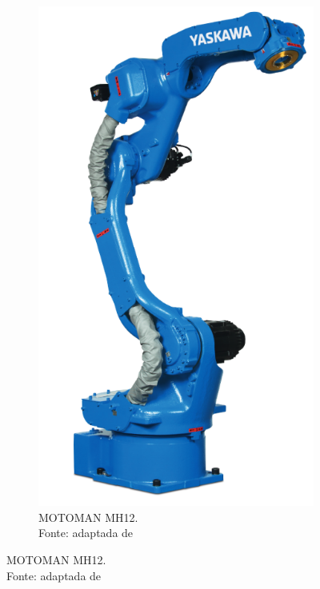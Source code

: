 \begin{figure}[h]
    \centering
    \begin{subfigure}[b]{0.3\textwidth}
        \includegraphics[width=\textwidth]{figs/mh12_foto}
        \caption{MOTOMAN MH12. \\Fonte: adaptada de}
        \label{fig::mh12_foto}
    \end{subfigure}
    \quad %

\end{figure}
